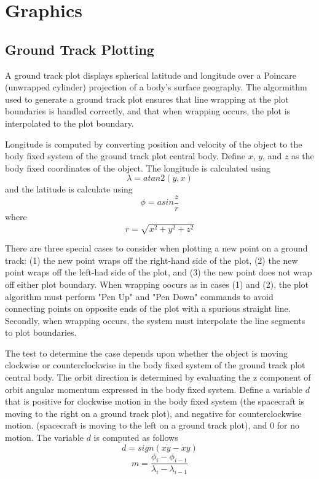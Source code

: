 \chapter{Graphics} \label{Ch:Graphics}

\section{Ground Track Plotting}

A ground track plot displays spherical latitude and longitude over a Poincare (unwrapped cylinder) projection of a body's surface geography. The algormithm used to generate a ground track plot ensures that line wrapping at the plot boundaries is handled correctly, and that when wrapping occurs, the plot is interpolated to the plot boundary.

Longitude is computed by converting position and velocity of the object to the body fixed system of the ground track plot central body.  Define $x$, $y$, and $z$ as the body fixed coordinates of the object.   The longitude is calculated using
%
\begin{equation}
     \lambda =  atan2(y,x)
\end{equation}
%
and the latitude is calculate using
%
\begin{equation}
     \phi = asin{\frac{z}{r}}
\end{equation}
%
where
%
\begin{equation}
    r = \sqrt{x^2 + y^2 + z^2}
\end{equation}

There are three special cases to consider when plotting a new point on a ground track: (1) the new point wraps off the right-hand side of the plot, (2) the new point wraps off the left-had side of the plot, and (3) the new point does not wrap off either plot boundary.  When wrapping oocurs as in cases (1) and (2), the plot algorithm must perform  "Pen Up" and "Pen Down" commands to avoid connecting points on opposite ends of the plot with a spurious straight line.  Secondly, when wrapping occurs, the system must interpolate the line segments to plot boundaries. 

The test to determine the case depends  upon whether the object is moving clockwise or counterclockwise in the body fixed system of the ground track plot central body.    The orbit direction is determined by evaluating the z component of orbit angular momentum expressed in the body fixed system.  Define a variable $d$ that is positive for clockwise motion in the body fixed system (the spacecraft is moving to the right on a ground track plot), and negative for counterclockwise motion. (spacecraft is moving to the left on  a ground track plot), and 0 for no motion.   The variable $d$ is computed as follows
%
\begin{equation}
   d = sign(x \dot{y} - \dot{x}y)
\end{equation}
%
%
\begin{equation}
    m = \frac{\phi_i -\phi_{i-1}}{\lambda_i - \lambda_{i-1}}
\end{equation}

